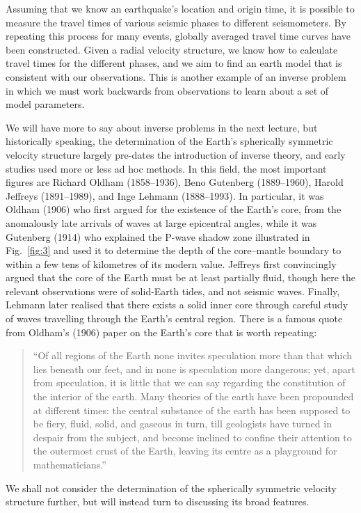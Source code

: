 Assuming that we know an earthquake's location and origin time, it is possible to measure the travel times of various seismic phases to different seismometers. By repeating 
this process for many events, globally averaged travel time curves have been constructed. Given a radial velocity structure, we know how to calculate travel times for 
the different phases, and we aim to find an earth model that is consistent with our observations. This is another example of an inverse problem in which we must work 
backwards from observations to learn about a set of model parameters.

We will have more to say about inverse problems in the next lecture, but historically speaking, 
the determination of the Earth's spherically symmetric velocity structure largely pre-dates the introduction of inverse theory, and early studies used more or less ad 
hoc methods. In this field, the most important figures are Richard Oldham (1858--1936), Beno Gutenberg (1889--1960), Harold Jeffreys (1891--1989), and 
Inge Lehmann (1888--1993). In particular, it was Oldham (1906) who first argued for the existence of the Earth's core, from the anomalously late arrivals of waves at large 
epicentral angles, while it was Gutenberg (1914) who explained the P-wave shadow zone illustrated in Fig.~\ref{fig:3} and used it to 
determine the depth of the core--mantle boundary to within a few tens of kilometres of its modern value. Jeffreys first convincingly argued that the core of the Earth must be at least partially fluid, though here the relevant observations were 
of solid-Earth tides, and not seismic waves. Finally, Lehmann later realised that there exists a solid inner core through careful study of waves travelling 
through the Earth's central region. There is a famous quote from Oldham's (1906) paper on the Earth's core that is worth repeating:
\begin{quote}
``Of all regions of the Earth none invites speculation more than that which lies beneath our feet, and in none is speculation more dangerous; yet, apart from 
speculation, it is little that we can say regarding the constitution of the interior of the earth. Many theories of the earth have been propounded at different 
times: the central substance of the earth has been supposed to be fiery, fluid, solid, and gaseous in turn, till geologists have turned in despair from the 
subject, and become inclined to confine their attention to the outermost crust of the Earth, leaving its centre as a playground for mathematicians.''
\end{quote}
We shall not consider the determination of the spherically symmetric velocity structure further, but will instead turn to discussing its broad features.

